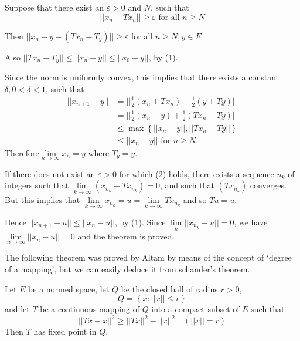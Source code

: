 Suppose that there exist an $\varepsilon > 0$ and $N$, such that
\begin{equation}
|| x_n - Tx_n || \ge \varepsilon \text{ for all } n \ge N \tag{2}
\end{equation}

Then $|| x_n - y - (Tx_n - T_y) || \ge \varepsilon$ for all $n \ge N, y \in F$.

Also $|| Tx_n - T_y || \le || x_n - y || \le || x_0 - y ||$, by \qquad (1).

Since the norm is uniformly convex, this implies that there exists a
constant $\delta, 0 < \delta < 1$, such that 
\begin{align*}
  || x_{n + 1} - y || & = || \frac{1}{2} (x_n + Tx_n) - \frac{1}{2} (y
  + Ty) ||\\ 
  & = || \frac{1}{2} (x_n - y) + \frac{1}{2} (Tx_n - Ty)||\\
  & \le \max \left\{ ||x_n - y ||, || Tx_n - Ty || \right\}\\
  & \le || x_n - y || \text{ for } n \ge N.
\end{align*}
Therefore\pageoriginale $\lim\limits_{n \to \infty} x_n = y$ where
$T_y = y$. 

If there does not exist an $\varepsilon > 0$ for which (2) holds, there
exists a sequence $n_k$ of integers such that $\lim\limits_{k \to
  \infty} (x_{n_k} - Tx_{n_k}) = 0$, and such that $(Tx_{n_k})$
converges. But this implies that $\lim\limits_{k \to \infty} x_{n_k} =
u = \lim\limits_{k \to \infty} Tx_{n_k}$ and so $Tu = u$. 

Hence $|| x_{n + 1} - u || \le || x_n - u||$, by (1). Since
$\lim\limits_{k} || x_{n_k} - u || = 0$, we have $\lim\limits_{n \to \infty}
|| x_n - u || = 0$ and the theorem is proved. 

The following theorem was proved by Altam by means of the concept of
`degree of a mapping', but we can easily deduce it from schander's
theorem. 

\begin{thmm}[Altman]%
  Let $E$ be a normed space, let $Q$ be the closed ball of radius $r > 0$,
  $$
  Q = \left\{ x : || x || \le r \right\}
  $$
  and let $T$ be a continuous mapping of $Q$ into a compact subset of
  $E$ such that 
  $$
  || Tx - x||^2 \ge || Tx ||^2 - || x ||^2 \quad ( || x || = r) 
  $$
Then $T$ has fixed point in $Q$.
\end{thmm}

